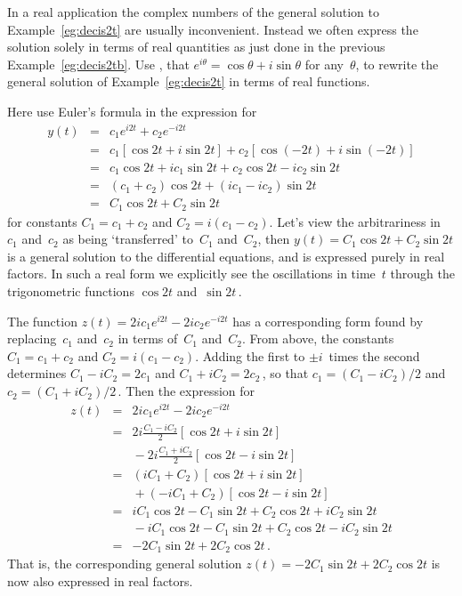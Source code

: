 \begin{example} \label{eg:realcis}
In a real application the complex numbers of the general solution to Example~\ref{eg:decis2t} are usually inconvenient.  
Instead we often express the solution solely in terms of real quantities as just done in the previous Example~\ref{eg:decis2tb}.
Use , that \(e^{i\theta}=\cos\theta+i\sin\theta\) for any~\(\theta\), to rewrite the general solution of Example~\ref{eg:decis2t} in terms of real functions.
\begin{solution}
Here use Euler's formula in the expression for
\begin{eqnarray*}
y(t)&=&c_1e^{i2t}+c_2e^{-i2t}
\\&=&c_1[\cos 2t+i\sin2t]+c_2[\cos(-2t)+i\sin(-2t)]
\\&=&c_1\cos2t+ic_1\sin2t +c_2\cos2t-ic_2\sin2t
\\&=&(c_1+c_2)\cos2t +(ic_1-ic_2)\sin2t
\\&=&C_1\cos2t+C_2\sin2t
\end{eqnarray*}
for constants \(C_1=c_1+c_2\) and \(C_2=i(c_1-c_2)\).
Let's view the arbitrariness in~\(c_1\) and~\(c_2\) as being `transferred' to~\(C_1\) and~\(C_2\), then \(y(t)=C_1\cos2t+C_2\sin2t\) is a general solution to the differential equations, and is expressed purely in real factors.
In such a real form we explicitly see the oscillations in time~\(t\) through the trigonometric functions \(\cos 2t\) and~\(\sin2t\)\,.

The function \(z(t)=2ic_1e^{i2t}-2ic_2e^{-i2t}\) has a corresponding form found by replacing~\(c_1\) and~\(c_2\) in terms of~\(C_1\) and~\(C_2\).
From above, the constants \(C_1=c_1+c_2\) and \(C_2=i(c_1-c_2)\).
Adding the first to \(\pm i\)~times the second determines \(C_1-iC_2=2c_1\) and \(C_1+iC_2=2c_2\)\,, so that \(c_1=(C_1-iC_2)/2\) and \(c_2=(C_1+iC_2)/2\)\,.  
Then the expression for
\begin{eqnarray*}
z(t)&=&2ic_1e^{i2t}-2ic_2e^{-i2t}
\\&=&2i\frac{C_1-iC_2}2[\cos2t+i\sin2t]
\\&&{}
-2i\frac{C_1+iC_2}2[\cos2t-i\sin2t]
\\&=&(iC_1+C_2)[\cos2t+i\sin2t]
\\&&{}
+(-iC_1+C_2)[\cos2t-i\sin2t]
\\&=&iC_1\cos2t-C_1\sin2t+C_2\cos2t+iC_2\sin2t
\\&&{}
-iC_1\cos2t-C_1\sin2t+C_2\cos2t-iC_2\sin2t
\\&=&-2C_1\sin2t+2C_2\cos2t\,.
\end{eqnarray*}
That is, the corresponding general solution \(z(t)=-2C_1\sin2t+2C_2\cos2t\) is now also expressed in real factors.
\end{solution}
\end{example}




